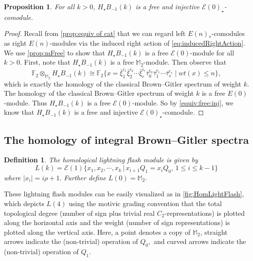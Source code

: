 \documentclass{amsart}
\newtheorem{proposition}[equation]{Proposition}
\newtheorem{definition}[equation]{Definition}
\theoremstyle{plain}
\numberwithin{equation}{section}
\numberwithin{figure}{section}
\newcommand{\mF}{{\mathbb F}}
\newcommand{\mM}{{\mathbb M}}
\newcommand{\cE}{{\mathcal E}}
\newcommand{\0}{\langle 0 \rangle }
\begin{document}
\begin{proposition}\label{equiv:BG:free}
For all $k>0$, $H_{\star}B_{-1}(k)$ is a free and injective $\cE(0)_{\star}$-comodule.
\end{proposition}

\begin{proof} Recall from \cref{prop:equiv of cat} that we can regard left $E(n)_*$-comodules as right $E(n)$-modules via the induced right action of \cref{eq:inducedRightAction}. We use \cref{prop:mFree} to show that $H_\star B_{-1}(k) $ is a free $\cE(0)$-module for all $k>0$. First, note that $H_\star B_{-1}(k)$ is a free $\mM_{2}$-module. Then observe that  \[  \mF_2 \otimes_{\mM_2} H_{\star}B_{-1}(k) \cong \mF_2 \{x =  \bar{\xi}_{1}^{i_{1}} \bar{\xi}_{2}^{i_{2}}\cdots \bar{\xi}_{r}^{i_{r}} \bar{\tau}_{0}^{\epsilon_{0}} \bar{\tau}_{1}^{\epsilon_{1}} \cdots \bar{\tau}_{s}^{\epsilon_{s}}\mid wt(x) \le n\}, \]
which is exactly the homology of the classical Brown--Gitler spectrum of weight $k$. The homology of the classical Brown--Gitler spectrum of weight $k$ is a free $E(0)$-module. Thus $H_\star B_{-1}(k) $ is a free $\cE(0)$-module. So by \cref{equiv:free:inj}, we know that $H_\star B_{-1}(k) $ is a free and injective $\cE(0)_{\star}$-comodule.  \end{proof}

\subsection{The homology of integral Brown--Gitler spectra}
\begin{definition}\label{def: lightning}
    The homological lightning flash module is given by 
    $$L(k) = \mathcal{E}(1) \{x_1, x_2, \cdots, x_k \, |\,  x_{i + 1} Q_1 =  x_i Q_0,\, 1 \leq i \leq k-1 \}$$
    where $| x_i| = i \rho + 1.$ Further define $L(0) = \mM_2.$
\end{definition}

These lightning flash modules can be easily visualized as in \cref{fig:HomLightFlash}, which depicts $L(4)$ using the motivic grading convention that the total topological degree (number of sign plus trivial real $C_2$-representations) is plotted along the horizontal axis and the weight (number of sign representations) is plotted along the vertical axis.  Here, a point denotes a copy of $\mM_2$, straight arrows indicate the
(non-trivial) operation of $Q_0,$ and curved arrows indicate the (non-trivial) operation of $Q_1.$  
\end{document}
